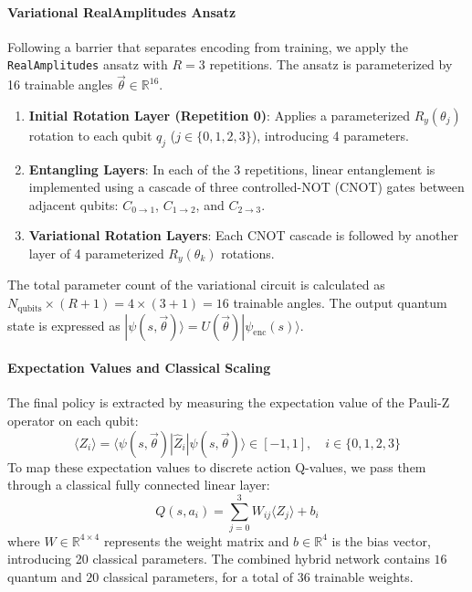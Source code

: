 \documentclass[12pt, a4paper]{article}
\begin{document}
\paragraph{Variational RealAmplitudes Ansatz}
Following a barrier that separates encoding from training, we apply the \texttt{RealAmplitudes} ansatz with $R = 3$ repetitions. The ansatz is parameterized by 16 trainable angles $\vec{\theta} \in \mathbb{R}^{16}$. 
\begin{enumerate}
    \item \textbf{Initial Rotation Layer (Repetition 0)}: Applies a parameterized $R_y(\theta_j)$ rotation to each qubit $q_j$ ($j \in \{0, 1, 2, 3\}$), introducing 4 parameters.
    \item \textbf{Entangling Layers}: In each of the 3 repetitions, linear entanglement is implemented using a cascade of three controlled-NOT (CNOT) gates between adjacent qubits: $C_{0\to1}$, $C_{1\to2}$, and $C_{2\to3}$.
    \item \textbf{Variational Rotation Layers}: Each CNOT cascade is followed by another layer of 4 parameterized $R_y(\theta_k)$ rotations.
\end{enumerate}
The total parameter count of the variational circuit is calculated as $N_{\text{qubits}} \times (R + 1) = 4 \times (3 + 1) = 16$ trainable angles. The output quantum state is expressed as $|\psi(s, \vec{\theta})\rangle = U(\vec{\theta}) |\psi_{\text{enc}}(s)\rangle$.

\paragraph{Expectation Values and Classical Scaling}
The final policy is extracted by measuring the expectation value of the Pauli-Z operator on each qubit:
\begin{equation}
    \langle Z_i \rangle = \langle \psi(s, \vec{\theta}) | \hat{Z}_i | \psi(s, \vec{\theta}) \rangle \in [-1, 1], \quad i \in \{0, 1, 2, 3\}
\end{equation}
To map these expectation values to discrete action Q-values, we pass them through a classical fully connected linear layer:
\begin{equation}
    Q(s, a_i) = \sum_{j=0}^{3} W_{ij} \langle Z_j \rangle + b_i
\end{equation}
where $W \in \mathbb{R}^{4 \times 4}$ represents the weight matrix and $b \in \mathbb{R}^4$ is the bias vector, introducing 20 classical parameters. The combined hybrid network contains $16$ quantum and $20$ classical parameters, for a total of $36$ trainable weights. 
\end{document}
